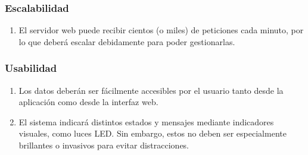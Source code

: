 \subsubsection{Escalabilidad}
\begin{enumerate}[resume, label=\textbf{\texttt{RNF-\arabic*}}]
  \item\label{nf:server-scalability} El servidor web puede recibir cientos (o miles)
  de peticiones cada minuto, por lo que deberá escalar debidamente para poder gestionarlas.
\end{enumerate}

\subsubsection{Usabilidad}
\begin{enumerate}[resume, label=\textbf{\texttt{RNF-\arabic*}}]
  \item\label{nf:data} Los datos deberán ser fácilmente accesibles por el usuario
  tanto desde la aplicación como desde la interfaz web.
  \item\label{nf:s-data} El sistema indicará distintos estados y mensajes mediante
  indicadores visuales, como luces LED. Sin embargo, estos no deben ser especialmente
  brillantes o invasivos para evitar distracciones.
\end{enumerate}

